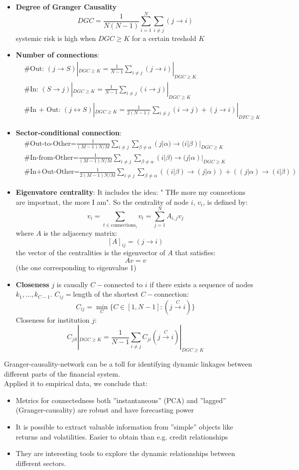 \begin{itemize}
	\item \textbf{Degree of Granger Causality}
	\[
	DGC = \frac{1}{N(N-1)} \sum_{i=1}^{N} \sum_{i\neq j} (j \to i)
	\]
	systemic risk is high when $DGC \geq K$ for a certain treshold $K$
	\item \textbf{Number of connections}:
	\begin{align*}
		& \text{\# Out: } (j \to S)|_{DGC \geq K} = \frac{1}{N-1} \sum_{i \neq j} (j \to i)|_{DGC \geq K}\\
		& \text{\# In: } (S\to j)|_{DGC \geq K} = \frac{1}{N-1}\sum_{i\neq j}(i \to j)|_{DGC \geq K}\\
		& \text{\# In + Out: } (j \leftrightarrow S)|_{DGC \geq K} = \frac{1}{2(N-1)}\sum_{i \neq j} (i \to j) + (j \to i)|_{DFC \geq K} 
	\end{align*}
\item \textbf{Sector-conditional connection}:
\begin{align*}
    & \text{\# Out-to-Other=} \frac{1}{(M-1)N/M}\sum_{i\neq j}\sum_{\beta \neq \alpha} (j|\alpha) \to (i| \beta)|_{DGC \geq K}\\
    & \text{\# In-from-Other=} \frac{1}{(M-1)N/M}\sum_{i\neq j}\sum_{\beta \neq \alpha} (i|\beta) \to (j| \alpha)|_{DGC \geq K} \\
    &     \text{\# In+Out-Other=} \frac{1}{2(M-1)N/M}\sum_{i\neq j}\sum_{\beta \neq \alpha} ((i|\beta) \to (j| \alpha)) + ((j|\alpha) \to (i| \beta))
\end{align*}
\item \textbf{Eigenvatore centrality}: It includes the idea: " THe more my conncetions are importnat, the more I am". So the centrality of node $i$, $v_i$, is defined by:
\[
v_i = \sum_{t\in \text{connections}_i} v_t = \sum_{j=1}^N A_{i,j}v_j
\]
where $A$ is the adjacency matrix:
\[
[A]_{ij} = (j \to i)
\]
the vector of the centralities is the eigenvector of $A$ that satisfies:
\[
Av = v
\]
(the one corresponding to eigenvalue 1)
\item \textbf{Closeness } $j$ is causally $C-$connected to $i$ if there exists a sequence of nodes $k_1,\ldots,k_{C-1}$. $C_{ij} = $length of the shortest $C-$connection:
\[
C_{ij} = \min_{C} \{C\in [1,N-1]:  (j \xrightarrow[]{C} i)\}
\]
Closeness for institution $j$:
\[
C_{jS}|_{DGC \geq K} = \frac{1}{N-1}\sum_{i \neq j} C_{ji}(j \xrightarrow[]{C} i)|_{DGC \geq K}
\]
\end{itemize}
Granger-causality-network can be a toll for identifying dynamic linkages between different parts of the financial system.\\
Applied it to empirical data, we conclude that:
\begin{itemize}
 \item Metrics for connectedness both ”instantaneous” (PCA) and ”lagged” (Granger-causality) are robust and have forecasting power
 \item It is possible to extract valuable information from ”simple” objects like returns and volatilities. Easier to obtain than e.g. credit relationships
 \item They are interesting tools to explore the dynamic relationships between different sectors.
\end{itemize}
